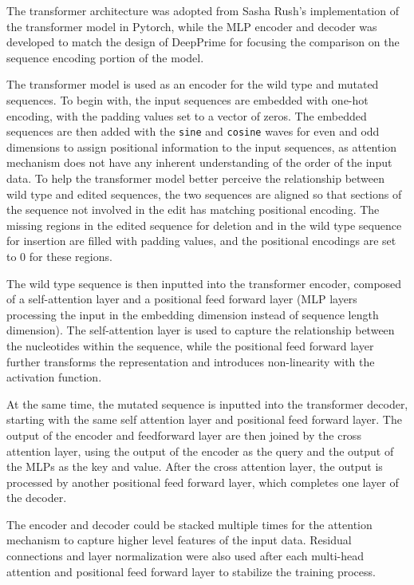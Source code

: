 The transformer architecture was adopted from Sasha Rush's implementation of the transformer model in Pytorch\cite{AnnotatedTransformer}, while the MLP encoder and decoder was developed to match the design of DeepPrime for focusing the comparison on the sequence encoding portion of the model\cite{yuPredictionEfficienciesDiverse2023}.

The transformer model is used as an encoder for the wild type and mutated sequences. To begin with, the input sequences are embedded with one-hot encoding, with the padding values set to a vector of zeros.
The embedded sequences are then added with the \verb|sine| and \verb|cosine| waves for even and odd dimensions to assign positional information to the input sequences, as attention mechanism does not have any inherent understanding of the order of the input data. 
To help the transformer model better perceive the relationship between wild type and edited sequences, the two sequences are aligned so that sections of the sequence not involved in the edit has matching positional encoding. The missing regions in the edited sequence for deletion and in the wild type sequence for insertion are filled with padding values, and the positional encodings are set to 0 for these regions.

The wild type sequence is then inputted into the transformer encoder, composed of a self-attention layer and a positional feed forward layer (MLP layers processing the input in the embedding dimension instead of sequence length dimension). The self-attention layer is used to capture the relationship between the nucleotides within the sequence, while the positional feed forward layer further transforms the representation and introduces non-linearity with the activation function. 

At the same time, the mutated sequence is inputted into the transformer decoder, starting with the same self attention layer and positional feed forward layer. The output of the encoder and feedforward layer are then joined by the cross attention layer, using the output of the encoder as the query and the output of the MLPs as the key and value. After the cross attention layer, the output is processed by another positional feed forward layer, which completes one layer of the decoder. 

The encoder and decoder could be stacked multiple times for the attention mechanism to capture higher level features of the input data. Residual connections and layer normalization were also used after each multi-head attention and positional feed forward layer to stabilize the training process.

